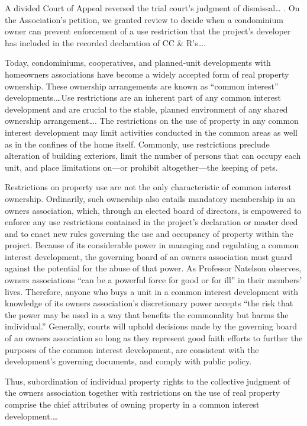 A divided Court of Appeal reversed the trial court's judgment of dismissal\ldots
. On the Association's petition, we granted review to decide when a condominium
owner can prevent enforcement of a use restriction that the project's developer
has included in the recorded declaration of CC \& R's\ldots .


Today, condominiums, cooperatives, and planned-unit developments with homeowners
associations have become a widely accepted form of real property ownership.
These ownership arrangements are known as ``common interest''
developments.\ldots Use restrictions are an inherent part of any common interest
development and are crucial to the stable, planned environment of any shared
ownership arrangement\ldots . The restrictions on the use of property in any
common interest development may limit activities conducted in the common areas
as well as in the confines of the home itself. Commonly, use restrictions
preclude alteration of building exteriors, limit the number of persons that can
occupy each unit, and place limitations on---or prohibit altogether---the
keeping of pets.

Restrictions on property use are not the only characteristic of common interest
ownership. Ordinarily, such ownership also entails mandatory membership in an
owners association, which, through an elected board of directors, is empowered
to enforce any use restrictions contained in the project's declaration or master
deed and to enact new rules governing the use and occupancy of property within
the project. Because of its considerable power in managing and regulating a
common interest development, the governing board of an owners association must
guard against the potential for the abuse of that power. As Professor Natelson
observes, owners associations ``can be a powerful force for good or for ill'' in
their members' lives. Therefore, anyone who buys a unit in a common interest
development with knowledge of its owners association's discretionary power
accepts ``the risk that the power may be used in a way that benefits the
commonality but harms the individual.'' Generally, courts will uphold decisions
made by the governing board of an owners association so long as they represent
good faith efforts to further the purposes of the common interest development,
are consistent with the development's governing documents, and comply with
public policy.

Thus, subordination of individual property rights to the collective judgment of
the owners association together with restrictions on the use of real property
comprise the chief attributes of owning property in a common interest
development.\ldots

